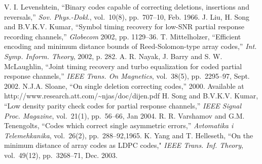 \begin{thebibliography}{17}
V. I. Levenshtein, ``Binary codes capable of correcting deletions,
insertions and reversals,'' \emph{Sov. Phys.-Dokl.}, vol.\ 10(8),
pp.~707--10, Feb. 1966.
J. Liu, H. Song and B.V.K.V. Kumar, ``Symbol timing recovery for
low-SNR partial response recording channels,'' \emph{Globecom}
2002, pp. 1129--36.%
T. Mittelholzer, ``Efficient encoding and minimum distance bounds
of Reed-Solomon-type array codes,'' \emph{Int. Symp. Inform.
Theory}, 2002, p. 282.%
A. R. Nayak, J. Barry and S. W. McLaughlin, ``Joint timing
recovery and turbo equalization for coded partial response
channels,'' \emph{IEEE Trans. On Magnetics}, vol.\ 38(5),
pp.~2295--97, Sept. 2002.
N.J.A. Sloane, ``On single deletion correcting codes,'' 2000.
Available at http://www.research.att.com/\~{ }njas/doc/dijen.pdf
H. Song and B.V.K.V. Kumar, ``Low density parity check codes for
partial response channels,'' \emph{IEEE Signal Proc. Magazine},
vol.\ 21(1), pp.~56--66, Jan 2004.
R. R. Varshamov and G.M. Tenengolts, ``Codes which correct single
asymmetric errors,'' \emph{Avtomatika i Telemehkanika}, vol.\
26(2), pp.~288--92,1965.
K. Yang and T. Helleseth, ``On the minimum distance of array codes
as LDPC codes," \emph{IEEE Trans. Inf. Theory}, vol.\ 49(12),
pp.~3268--71, Dec. 2003.
\end{thebibliography}
